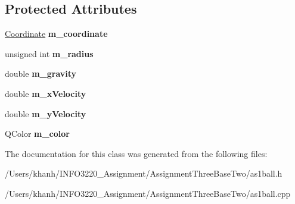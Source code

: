 \subsection*{Protected Attributes}
\begin{DoxyCompactItemize}
\item 
\hypertarget{classas1_ball_aa71097d6b0e160c7cca230730959c753}{\hyperlink{class_coordinate}{Coordinate} {\bfseries m\+\_\+coordinate}}\label{classas1_ball_aa71097d6b0e160c7cca230730959c753}

\item 
\hypertarget{classas1_ball_a033cca501e932a3fcb28063f3d5d3c9d}{unsigned int {\bfseries m\+\_\+radius}}\label{classas1_ball_a033cca501e932a3fcb28063f3d5d3c9d}

\item 
\hypertarget{classas1_ball_a7c46582889cdb5335357b634c2026b89}{double {\bfseries m\+\_\+gravity}}\label{classas1_ball_a7c46582889cdb5335357b634c2026b89}

\item 
\hypertarget{classas1_ball_ad8127f307f5be700ff7ef44e996849b4}{double {\bfseries m\+\_\+x\+Velocity}}\label{classas1_ball_ad8127f307f5be700ff7ef44e996849b4}

\item 
\hypertarget{classas1_ball_afeb0990e9b925a3119fe81ca6fc853d8}{double {\bfseries m\+\_\+y\+Velocity}}\label{classas1_ball_afeb0990e9b925a3119fe81ca6fc853d8}

\item 
\hypertarget{classas1_ball_a7c0dd5d4271acad05eaf659c44819b74}{Q\+Color {\bfseries m\+\_\+color}}\label{classas1_ball_a7c0dd5d4271acad05eaf659c44819b74}

\end{DoxyCompactItemize}


The documentation for this class was generated from the following files\+:\begin{DoxyCompactItemize}
\item 
/\+Users/khanh/\+I\+N\+F\+O3220\+\_\+\+Assignment/\+Assignment\+Three\+Base\+Two/as1ball.\+h\item 
/\+Users/khanh/\+I\+N\+F\+O3220\+\_\+\+Assignment/\+Assignment\+Three\+Base\+Two/as1ball.\+cpp\end{DoxyCompactItemize}
